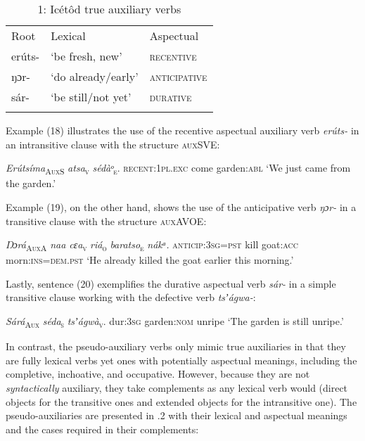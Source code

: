 \begin{table}
\begin{table}
\caption{1: Icétôd true auxiliary verbs}
\label{tab:10}


\begin{tabularx}{\textwidth}{XXX}
\lsptoprule

Root & Lexical & Aspectual\\
erúts- & ‘be fresh, new’ & \textsc{recentive}\\
ŋɔr- & ‘do already/early’ & \textsc{anticipative}\\
sár- & ‘be still/not yet’ & \textsc{durative}\\
\lspbottomrule
\end{tabularx}
\end{table}
Example (18) illustrates the use of the recentive aspectual auxiliary verb \textit{erúts-} in an intransitive clause with the structure \textsc{auxSVE:}




\textit{Erúts}\textit{íma}\textsc{\textsubscript{AuxS}}   \textit{atsa}\textsc{\textsubscript{v}}\textit{     sédàᵒ}\textsc{\textsubscript{e}}.
\textsc{recent:1pl.exc}   come     garden:\textsc{abl}
‘We just came from the garden.’


Example (19), on the other hand, shows the use of the anticipative verb \textit{ŋɔr-} in a transitive clause with the structure \textsc{auxAVOE}:



\textit{Ŋ}\textit{ɔrá}\textsc{\textsubscript{AuxA}}\textit{ naa   cɛa}\textsc{\textsubscript{v}}\textit{   riá}\textsc{\textsubscript{o}}\textit{        baratso}\textsc{\textsubscript{e}}\textit{ nákᵃ.}
\textsc{anticip:3sg=pst}   kill   goat:\textsc{acc} morn:\textsc{ins=dem.pst}
‘He already killed the goat earlier this morning.’


Lastly, sentence (20) exemplifies the durative aspectual verb \textit{sár-} in a simple transitive clause working with the defective verb \textit{tsʼágwa-}:



\textit{Sárá}\textsc{\textsubscript{Aux}}\textit{  séda}\textsc{\textsubscript{s}}\textit{     tsʼágwà}\textsc{\textsubscript{v}}.
dur:\textsc{3sg}   garden:\textsc{nom}   unripe
‘The garden is still unripe.’


In contrast, the pseudo-auxiliary verbs only mimic true auxiliaries in that they are fully lexical verbs yet ones with potentially aspectual meanings, including the completive, inchoative, and occupative. However, because they are not \textit{syntactically} auxiliary, they take complements as any lexical verb would (direct objects for the transitive ones and extended objects for the intransitive one). The pseudo-auxiliaries are presented in .2 with their lexical and aspectual meanings and the cases required in their complements:



\end{table}
